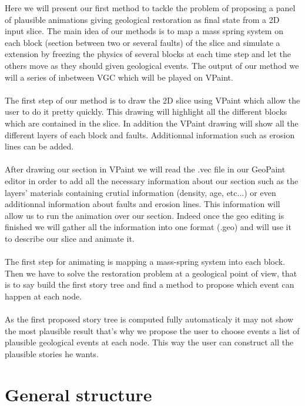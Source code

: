 \documentclass[12pt, a4paper]{memoir} %
\begin{document}
Here we will present our first method to tackle the problem of proposing a panel of plausible animations giving geological restoration as final state from a 2D input slice. 
The main idea of our methods is to map a mass spring system on each block (section between two or several faults) of the slice and simulate a extension by freezing the physics of several blocks at each time step and let the others move as they should given geological events. The output of our method we will a series of inbetween VGC which will be played on VPaint.\\\\
The first step of our method is to draw the 2D slice using VPaint which allow the user to do it pretty quickly.
This drawing will highlight all the different blocks which are contained in the slice.
In addition the VPaint drawing will show all the different layers of each block and faults. Additionnal information such as erosion lines can be added. \\\\
After drawing our section in VPaint we will read the .vec file in our GeoPaint editor in order to add all the necessary information about our section such as the layers' materials containing crutial information (density, age, etc...) or even  additionnal information about faults and erosion lines. This information will allow us to run the animation over our section.
Indeed once the geo editing is finished we will gather all the information into one format (.geo) and will use it to describe our slice and animate it.\\\\
The first step for animating is mapping a mass-spring system into each block. Then we have to solve the restoration problem at a geological point of view, that is to say build the first story tree and find a method to propose which event can happen at each node.\\\\
As the first proposed story tree is computed fully automaticaly it may not show the most plausible result that's why we propose the user to choose events a list of plausible geological events at each node.
This way the user can construct all the plausible stories he wants.

\section{General structure}
\end{document}
